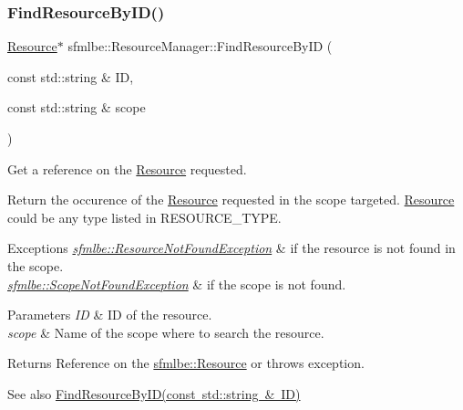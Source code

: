 \subsubsection{\texorpdfstring{Find\+Resource\+By\+I\+D()}{FindResourceByID()}\hspace{0.1cm}{\footnotesize\ttfamily [2/2]}}
{\footnotesize\ttfamily \mbox{\hyperlink{classsfmlbe_1_1_resource}{Resource}}$\ast$ sfmlbe\+::\+Resource\+Manager\+::\+Find\+Resource\+By\+ID (\begin{DoxyParamCaption}\item[{const std\+::string \&}]{ID,  }\item[{const std\+::string \&}]{scope }\end{DoxyParamCaption})}



Get a reference on the \mbox{\hyperlink{classsfmlbe_1_1_resource}{Resource}} requested. 

Return the occurence of the \mbox{\hyperlink{classsfmlbe_1_1_resource}{Resource}} requested in the scope targeted. \mbox{\hyperlink{classsfmlbe_1_1_resource}{Resource}} could be any type listed in R\+E\+S\+O\+U\+R\+C\+E\+\_\+\+T\+Y\+PE. 
\begin{DoxyExceptions}{Exceptions}
{\em \mbox{\hyperlink{classsfmlbe_1_1_resource_not_found_exception}{sfmlbe\+::\+Resource\+Not\+Found\+Exception}}} & if the resource is not found in the scope. \\
\hline
{\em \mbox{\hyperlink{classsfmlbe_1_1_scope_not_found_exception}{sfmlbe\+::\+Scope\+Not\+Found\+Exception}}} & if the scope is not found. \\
\hline
\end{DoxyExceptions}

\begin{DoxyParams}{Parameters}
{\em ID} & ID of the resource. \\
\hline
{\em scope} & Name of the scope where to search the resource. \\
\hline
\end{DoxyParams}
\begin{DoxyReturn}{Returns}
Reference on the \mbox{\hyperlink{classsfmlbe_1_1_resource}{sfmlbe\+::\+Resource}} or throws exception. 
\end{DoxyReturn}
\begin{DoxySeeAlso}{See also}
\mbox{\hyperlink{classsfmlbe_1_1_resource_manager_aea559b11d248db65d6bff0caf902098a}{Find\+Resource\+By\+I\+D(const std\+::string \& I\+D)}} 
\end{DoxySeeAlso}
\mbox{\label{classsfmlbe_1_1_resource_manager_a99c69873bb1084afe35a97986c657ee9}} 

